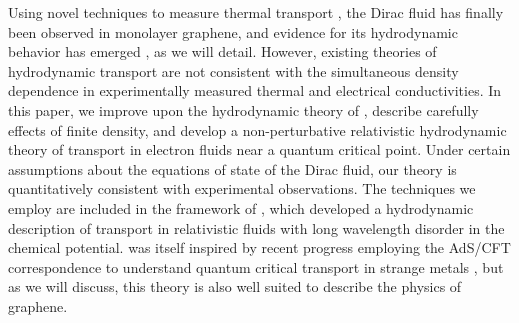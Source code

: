 Using novel techniques to measure thermal transport \cite{fong_ultrasensitive_2012, fong_measurement_2013, crossno_development_2015},  the Dirac fluid has finally been  observed in monolayer graphene, and evidence for its hydrodynamic behavior  has emerged \cite{crossno_observation_2016}, as we will detail.  However, existing theories of hydrodynamic transport are not consistent with the simultaneous density dependence in experimentally measured thermal and electrical conductivities.   In this paper, we improve upon the hydrodynamic theory of \cite{hartnoll_theory_2007}, describe carefully effects of finite density, and develop a non-perturbative relativistic hydrodynamic theory of transport in electron fluids near a quantum critical point.   Under certain assumptions about the equations of state of the Dirac fluid, our theory is quantitatively consistent with experimental observations.   The techniques we employ are included in the framework of \cite{lucas_hydrodynamic_2015}, which developed a hydrodynamic description of transport in relativistic fluids with long wavelength disorder in the chemical potential.   \cite{lucas_hydrodynamic_2015} was itself inspired by recent progress employing the AdS/CFT correspondence to understand quantum critical transport in strange metals \cite{blake_holographic_2014, davison_holographic_2014, balasubramanian_losing_2014, lucas_scale-invariant_2014, lucas_conductivity_2015, davison_dissecting_2015, blake_momentum_2015, donos_navier-stokes_2015, grozdanov_absence_2015}, but as we will discuss, this theory is also well suited to describe the physics of graphene.



